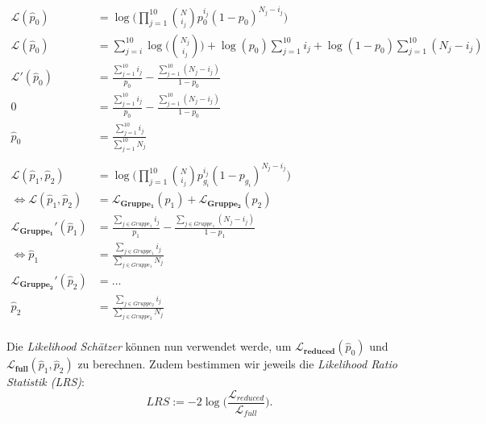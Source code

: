 \documentclass[12pt]{article}
\begin{document}
\begin{align*}
    \mathbf{\mathcal{L}}(\hat p_{0})  &= \log\Bigg( \prod_{j=1}^{10} \binom{N}{i_{j}}p_{0}^{i_{j}}(1-p_{0})^{N_{j}-i_{j}}  \Bigg)\\
    \mathbf{\mathcal{L}}(\hat p_{0})  &= \sum_{j=i}^{10} \log\Bigg(\binom{N_{j}}{i_{j}}\Bigg) + \log(p_{0})\sum_{j=1}^{10} i_{j} + \log(1-p_{0}) \sum_{j=1}^{10} (N_{j} - i_{j}) \\
    \mathbf{\mathcal{L}}'(\hat p_{0}) &= \frac{\sum_{j=1}^{10} i_{j}}{p_{0}} - \frac{\sum_{j=1}^{10} (N_{j} - i_{j})}{1-p_{0}} \\
                   0 &= \frac{\sum_{j=1}^{10} i_{j}}{p_{0}} - \frac{\sum_{j=1}^{10} (N_{j} - i_{j})}{1-p_{0}} \\
                   \hat p_{0} &= \frac{\sum_{j=1}^{10} i_{j}}{\sum_{j=1}^{10} N_{j}} \\ 
                              & \\
    \mathbf{\mathcal{L}}(\hat p_{1}, \hat p_{2})  &= \log\Bigg( \prod_{j=1}^{10} \binom{N}{i_{j}}p_{g_{i}}^{i_{j}}(1-p_{g_{i}})^{N_{j}-i_{j}}  \Bigg)\\
    \iff \mathbf{\mathcal{L}}(\hat p_{1}, \hat p_{2}) &= \mathbf{\mathcal{L}_{Gruppe_{1}}}(p_{1}) + \mathbf{\mathcal{L}_{Gruppe_{2}}}(p_{2}) \\
    \mathbf{\mathcal{L}_{Gruppe_{1}}}'(\hat p_{1}) &= \frac{\sum_{j \in Gruppe_{1}}i_{j}}{p_{1}} - \frac{\sum_{j \in Gruppe_{1}} (N_{j} - i_{j})}{1-p_{1}} \\
    \iff \hat p_{1} &= \frac{\sum_{j \in Gruppe_{1}} i_{j}}{\sum_{j \in Gruppe_{1}} N_{j}}\\
    \mathbf{\mathcal{L}_{Gruppe_{2}}}'(\hat p_{2}) &= \dots \\
    \hat p_{2} &= \frac{\sum_{j \in Gruppe_{2}} i_{j}}{\sum_{j \in Gruppe_{2}} N_{j}}\\
\end{align*}

Die \textit{Likelihood Schätzer} können nun verwendet werde, um $\mathbf{\mathcal{L}_{reduced}}(\hat p_{0})$ und $\mathbf{\mathcal{L}_{full}}(\hat p_{1}, \hat p_{2})$ zu 
berechnen. Zudem bestimmen wir jeweils die \textit{Likelihood Ratio Statistik (LRS)}:
\[
    LRS := -2 \log\Big(\frac{\mathcal{L}_{reduced}}{\mathcal{L}_{full}}\Big)
.\]
\end{document}

